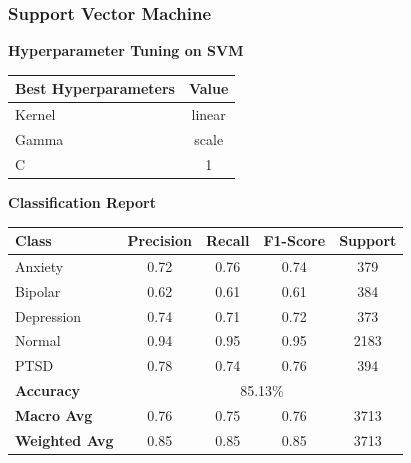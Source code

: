 \pagebreak
\subsubsection{Support Vector Machine}
\begin{center}
    \textbf{Hyperparameter Tuning on SVM} \\[0.5em]
    \begin{tabular}{|l|c|}
        \hline
        \textbf{Best Hyperparameters}  & \textbf{Value} \\ \hline
        Kernel                        & linear         \\ \hline
        Gamma                         & scale          \\ \hline
        C                              & 1              \\ \hline
    \end{tabular}
\end{center}

\begin{center}
    \textbf{Classification Report} \\[0.5em]
    \begin{tabular}{|l|c|c|c|c|}
        \hline
        \textbf{Class} & \textbf{Precision} & \textbf{Recall} & \textbf{F1-Score} & \textbf{Support} \\ \hline
        Anxiety        & 0.72               & 0.76            & 0.74              & 379             \\ \hline
        Bipolar        & 0.62               & 0.61            & 0.61              & 384             \\ \hline
        Depression     & 0.74               & 0.71            & 0.72              & 373             \\ \hline
        Normal         & 0.94               & 0.95            & 0.95              & 2183            \\ \hline
        PTSD           & 0.78               & 0.74            & 0.76              & 394             \\ \hline
        \textbf{Accuracy} & \multicolumn{4}{|c|}{85.13\%} \\ \hline
        \textbf{Macro Avg} & 0.76            & 0.75            & 0.76              & 3713            \\ \hline
        \textbf{Weighted Avg} & 0.85         & 0.85            & 0.85              & 3713            \\ \hline
    \end{tabular}
\end{center}


